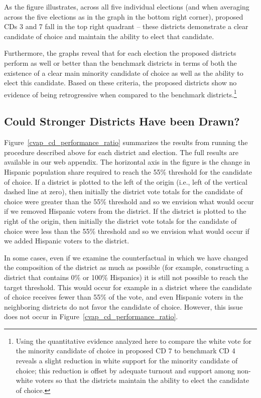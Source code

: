 \documentclass[12pt]{article}
\begin{document}
As the figure illustrates, across all five individual elections (and
when averaging across the five elections as in the graph in the bottom
right corner), proposed CDs 3 and 7 fall in the top right quadrant --
these districts demonstrate a clear candidate of choice and maintain
the ability to elect that candidate.

Furthermore, the graphs reveal that for each election the proposed
districts perform as well or better than the benchmark districts in
terms of both the existence of a clear main minority candidate of
choice as well as the ability to elect this candidate. Based on these
criteria, the proposed districts show no evidence of being
retrogressive when compared to the benchmark districts.\footnote{Using the quantitative evidence analyzed here to compare the white vote for the minority candidate of choice in proposed CD 7 to benchmark CD 4 reveals a slight reduction in white support for the minority candidate of choice; this reduction is offset by adequate turnout and support among non-white voters so that the districts maintain the ability to elect the candidate of choice.}

\subsection{Could Stronger Districts Have been Drawn?}

Figure~\ref{cvap_cd_performance_ratio} summarizes the results from
running the procedure described above for each district and election.
The full results are available in our web appendix. The horizontal
axis in the figure is the change in Hispanic population share required
to reach the 55\% threshold for the candidate of choice. If a district
is plotted to the left of the origin (i.e., left of the vertical
dashed line at zero), then initially the district vote totals for the
candidate of choice were greater than the 55\% threshold and so we
envision what would occur if we removed Hispanic voters from the
district. If the district is plotted to the right of the origin, then
initially the district vote totals for the candidate of choice were
less than the 55\% threshold and so we envision what would occur if we
added Hispanic voters to the district.

In some cases, even if we examine the counterfactual in which we have
changed the composition of the district as much as possible (for
example, constructing a district that contains 0\% or 100\% Hispanics)
it is still not possible to reach the target threshold. This would
occur for example in a district where the candidate of choice receives
fewer than 55\% of the vote, and even Hispanic voters in the
neighboring districts do not favor the candidate of choice. However,
this issue does not occur in Figure~\ref{cvap_cd_performance_ratio}.
\end{document}
